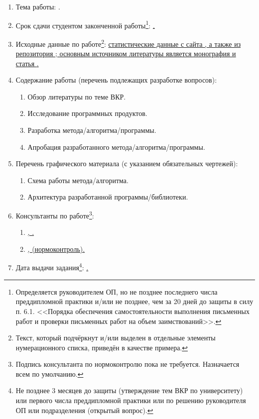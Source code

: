 \begin{enumerate}[1.]
	\item Тема работы: {\expandafter \ulined \thesisTitle.}
	\item Срок сдачи студентом законченной работы\footnote{Определяется руководителем ОП, но не позднее последнего числа преддипломной практики и/или не позднее, чем за 20 дней до защиты в силу п. 6.1. <<Порядка обеспечения самостоятельности выполнения письменных работ и проверки письменных работ на объем заимствований>>.}: \uline{\thesisDeadline.} 
	\item Исходные данные по работе\footnote{Текст, который подчёркнут и/или выделен в отдельные элементы нумерационного списка, приведён в качестве примера.}: \uline{статистические данные с сайта \cite{gosstat}, а также из репозитория \cite{uci}; основным источником литературы является монография \cite{Book} и статья \cite{Article}.}%
	\printbibliographyTask %
	\item Содержание работы (перечень подлежащих разработке вопросов):
	\begin{enumerate}[label=\theenumi\arabic*.]
		\item Обзор литературы по теме ВКР.
		\item Исследование программных продуктов.
		\item Разработка метода/алгоритма/программы.
		\item Апробация разработанного метода/алгоритма/программы. 
	\end{enumerate}
	\item Перечень графического материала (с указанием обязательных чертежей): 
	\begin{enumerate}[label=\theenumi\arabic*.]
		\item Схема работы метода/алгоритма.
		\item Архитектура разработанной программы/библиотеки.
	\end{enumerate}	
		\item Консультанты по работе\footnote{Подпись консультанта по нормоконтролю пока не требуется. Назначается всем по умолчанию.}:
		\begin{enumerate}[label=\theenumi\arabic*.] 
		\item  \uline{\emakefirstuc{\ConsultantExtraDegree}, \ConsultantExtra.} %
		\item \uline{\emakefirstuc{\ConsultantNormDegree}, \ConsultantNorm{} (нормоконтроль).} %
	\end{enumerate}
		\item Дата выдачи задания\footnote{Не позднее 3 месяцев до защиты (утверждение тем ВКР по университету) или первого числа преддипломной практики или по решению руководителя ОП или подразделения (открытый вопрос).}: \uline{\thesisStartDate.}
\end{enumerate}


